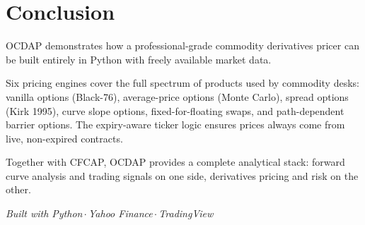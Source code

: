 \documentclass[11pt,a4paper]{article}
\begin{document}
\section{Conclusion}

OCDAP demonstrates how a professional-grade commodity derivatives pricer can
be built entirely in Python with freely available market data.

Six pricing engines cover the full spectrum of products used by commodity
desks: vanilla options (Black-76), average-price options (Monte Carlo), spread
options (Kirk 1995), curve slope options, fixed-for-floating swaps, and
path-dependent barrier options. The expiry-aware ticker logic ensures prices
always come from live, non-expired contracts.

Together with CFCAP, OCDAP provides a complete analytical stack: forward curve
analysis and trading signals on one side, derivatives pricing and risk on the other.

\vspace{1.2cm}
\begin{center}
\textit{Built with Python\,$\cdot$\,Yahoo Finance\,$\cdot$\,TradingView}
\end{center}
\end{document}
